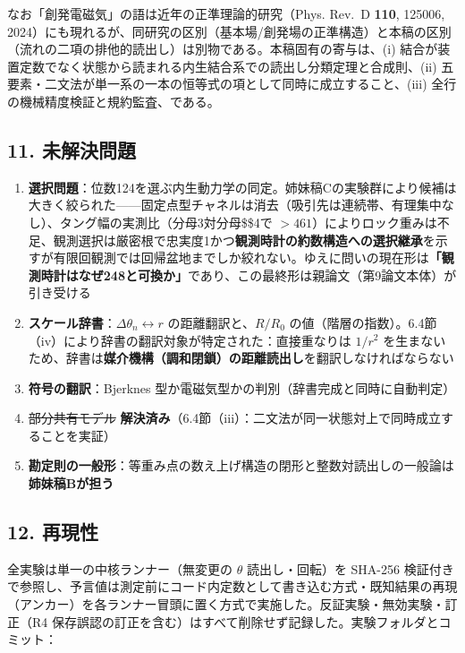 \documentclass[
  a4paper,
]{ltjsarticle}
\providecommand{\tightlist}{%
  \setlength{\itemsep}{0pt}\setlength{\parskip}{0pt}}
\begin{document}
なお「創発電磁気」の語は近年の正準理論的研究（Phys. Rev.~D \textbf{110},
125006,
2024）にも現れるが、同研究の区別（基本場/創発場の正準構造）と本稿の区別（流れの二項の排他的読出し）は別物である。本稿固有の寄与は、(i)
結合が装置定数でなく状態から読まれる内生結合系での読出し分類定理と合成則、(ii)
五要素・二文法が単一系の一本の恒等式の項として同時に成立すること、(iii)
全行の機械精度検証と規約監査、である。

\subsection{11. 未解決問題}\label{ux672aux89e3ux6c7aux554fux984c}

\begin{enumerate}
\def\labelenumi{\arabic{enumi}.}
\tightlist
\item
  \textbf{選択問題}：位数124を選ぶ内生動力学の同定。姉妹稿Cの実験群により候補は大きく絞られた------固定点型チャネルは消去（吸引先は連続帯、有理集中なし）、タング幅の実測比（分母3対分母\$\ge\$4で
  \(>461\)）によりロック重みは不足、観測選択は厳密根で忠実度1かつ\textbf{観測時計の約数構造への選択継承}を示すが有限回観測では回帰盆地までしか絞れない。ゆえに問いの現在形は\textbf{「観測時計はなぜ248と可換か」}であり、この最終形は親論文（第9論文本体）が引き受ける
\item
  \textbf{スケール辞書}：\(\Delta\theta_n\leftrightarrow r\)
  の距離翻訳と、\(R/R_0\)
  の値（階層の指数）。6.4節（iv）により辞書の翻訳対象が特定された：直接重なりは
  \(1/r^2\)
  を生まないため、辞書は\textbf{媒介機構（調和閉鎖）の距離読出し}を翻訳しなければならない
\item
  \textbf{符号の翻訳}：Bjerknes
  型か電磁気型かの判別（辞書完成と同時に自動判定）
\item
  \st{部分共有モデル}
  \textbf{解決済み}（6.4節（iii）：二文法が同一状態対上で同時成立することを実証）
\item
  \textbf{勘定則の一般形}：等重み点の数え上げ構造の閉形と整数対読出しの一般論は\textbf{姉妹稿Bが担う}
\end{enumerate}

\subsection{12. 再現性}\label{ux518dux73feux6027}

全実験は単一の中核ランナー（無変更の \(\theta\) 読出し・回転）を SHA-256
検証付きで参照し、予言値は測定前にコード内定数として書き込む方式・既知結果の再現（アンカー）を各ランナー冒頭に置く方式で実施した。反証実験・無効実験・訂正（R4
保存誤認の訂正を含む）はすべて削除せず記録した。実験フォルダとコミット：
\end{document}
